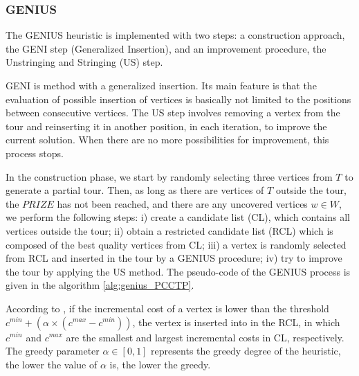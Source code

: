 \documentclass{singlecol-new}
\theoremstyle{TH}{
\newtheorem{lemma}{Lemma}
\newtheorem{theorem}[lemma]{Theorem}
\newtheorem{corrolary}[lemma]{Corrolary}
\newtheorem{conjecture}[lemma]{Conjecture}
\newtheorem{proposition}[lemma]{Proposition}
\newtheorem{claim}[lemma]{Claim}
\newtheorem{stheorem}[lemma]{Wrong Theorem}
}
\theoremstyle{THrm}{
\newtheorem{definition}{Definition}[section]
\newtheorem{question}{Question}[section]
\newtheorem{remark}{Remark}
\newtheorem{scheme}{Scheme}
}
\theoremstyle{THhit}{
\newtheorem{case}{Case}[section]
}
\begin{document}
\subsubsection{GENIUS}

The GENIUS heuristic \citep{genius} is implemented with  two steps: a construction approach, the GENI step (Generalized Insertion), and an improvement procedure, the Unstringing and Stringing (US) step. 

GENI is method with a generalized insertion. Its main feature is that the evaluation of possible insertion of vertices is basically not limited to the positions between consecutive vertices.
The US step involves removing a vertex from the tour and reinserting it in another position, in each iteration, to improve the current solution. When there are no more possibilities for improvement, this process stops.


In the construction phase, we start by randomly selecting three vertices from $T$ to generate a partial tour. Then, as long as there are vertices of $T$ outside the tour, the $PRIZE$ has not been reached, and there are any uncovered vertices $w \in W $, we  perform the following steps: i) create a candidate list (CL), which contains all vertices outside the tour; ii) obtain a restricted candidate list (RCL) which is composed of the best quality vertices from CL; iii) a vertex is randomly selected from RCL and inserted in the tour by a GENIUS procedure; iv) try to improve the tour by applying the US method. The pseudo-code of the GENIUS process is given in the algorithm \ref{alg:genius_PCCTP}.

According to \citet{daSilva}, if the incremental cost of a vertex is lower than the threshold $c^{min} + (\alpha \times (c^{max}-c^{min}))$, the vertex is inserted into in the RCL, in which $c^{min}$ and $c^{max}$ are the smallest and largest incremental costs in CL, respectively. The greedy parameter $\alpha \in [0,1]$ represents the greedy degree of the heuristic, the lower the value of $\alpha$ is, the lower the greedy.
\end{document}
